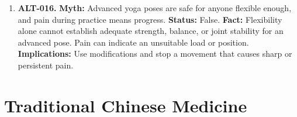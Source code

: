 \documentclass[11pt,oneside]{book}
\begin{document}
\begin{enumerate}[leftmargin=0pt,labelwidth=0pt,labelsep=0pt,itemindent=0pt]
\item[] \textbf{ALT-016.} \textbf{Myth:} Advanced yoga poses are safe for anyone flexible enough, and pain during practice means progress.\newline
\textbf{Status:} False.\newline
\textbf{Fact:} Flexibility alone cannot establish adequate strength, balance, or joint stability for an advanced pose. Pain can indicate an unsuitable load or position. \cite{ref137}\newline
\textbf{Implications:} Use modifications and stop a movement that causes sharp or persistent pain.
\end{enumerate}

\section{Traditional Chinese Medicine}
\end{document}
